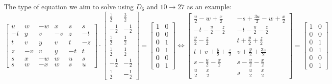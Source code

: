 \documentclass[a4paper,10pt]{article}
\theoremstyle{plain}
\theoremstyle{definition}
\theoremstyle{remark}
\begin{document}
The type of equation we aim to solve using \(D_6\) and \(10 \to 27\) as an example:
\begingroup
\renewcommand*{\arraystretch}{1.5}
\[\displaystyle \left[\begin{matrix}u & w & - w & x & s & s\\- t & y & v & - v & z & - t\\t & v & y & v & t & - z\\z & - v & v & y & - t & t\\s & x & - w & w & u & s\\s & w & - x & w & s & u\end{matrix}\right]
\cdot
\displaystyle \left[\begin{matrix}\frac{1}{2} & \frac{3}{2}\\- \frac{1}{2} & - \frac{1}{2}\\\frac{1}{2} & \frac{1}{2}\\\frac{1}{2} & \frac{1}{2}\\- \frac{1}{2} & - \frac{1}{2}\\\frac{1}{2} & - \frac{1}{2}\end{matrix}\right]
=
\displaystyle \left[\begin{matrix}1 & 0\\0 & 0\\0 & 1\\0 & 1\\0 & 0\\0 & 1\end{matrix}\right]
\iff
\displaystyle \left[\begin{matrix}\frac{u}{2} - w + \frac{x}{2} & - s + \frac{3 u}{2} - w + \frac{x}{2}\\- t - \frac{y}{2} - \frac{z}{2} & - t - \frac{y}{2} - \frac{z}{2}\\\frac{y}{2} - \frac{z}{2} & t + \frac{y}{2} + \frac{z}{2}\\t + v + \frac{y}{2} + \frac{z}{2} & v + \frac{y}{2} + \frac{3 z}{2}\\s - \frac{u}{2} - \frac{x}{2} & s - \frac{u}{2} - \frac{x}{2}\\\frac{u}{2} - \frac{x}{2} & s - \frac{u}{2} - \frac{x}{2}\end{matrix}\right] = \left[\begin{matrix}1 & 0\\0 & 0\\0 & 1\\0 & 1\\0 & 0\\0 & 1\end{matrix}\right]\]
\endgroup
\end{document}
